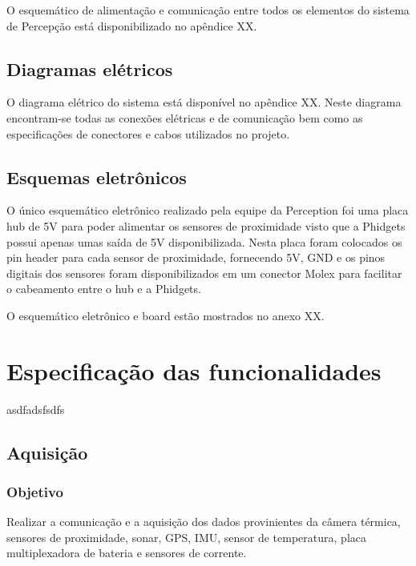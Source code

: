 O esquemático de alimentação e comunicação entre todos os elementos do sistema de Percepção está disponibilizado no apêndice XX.

\subsection{Diagramas elétricos}
\label{sec:diage}
O diagrama elétrico do sistema está disponível no apêndice XX. Neste diagrama encontram-se todas as conexões elétricas e de comunicação bem como as especificações de conectores e cabos utilizados no projeto. 

\subsection{Esquemas eletrônicos}
\label{ssec:esqe}

O único esquemático eletrônico realizado pela equipe da Perception foi uma placa hub de 5V para poder alimentar os sensores de proximidade visto que a Phidgets possui apenas umas saída de 5V disponibilizada. Nesta placa foram colocados os pin header para cada sensor de proximidade, fornecendo 5V, GND e os pinos digitais dos sensores foram disponibilizados em um conector Molex para facilitar o cabeamento entre o hub e a Phidgets.

O esquemático eletrônico e board estão mostrados no anexo XX.

\section{Especificação das funcionalidades}
\label{sec:espf}
asdfadsfsdfs


\subsection{Aquisição}
\label{ssec:func1}
    \subsubsection{Objetivo}
    Realizar a comunicação e a aquisição dos dados provinientes da câmera térmica, sensores de proximidade, sonar, GPS, IMU, sensor de temperatura, placa multiplexadora de bateria e sensores de corrente.
        
